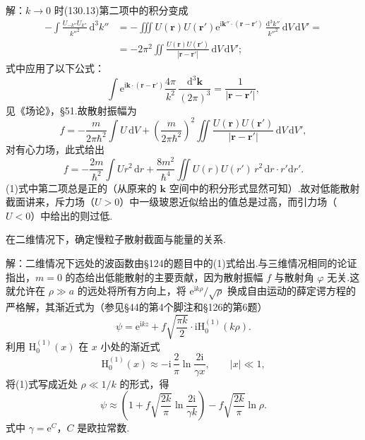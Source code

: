 \begin{xiti}
解：$k\to0$ 时(130.13)第二项中的积分变成
\begin{equation*}
\begin{aligned}
  -\int\frac{U_{-k''}U_{k''}}{k''^2}\,\mathrm{d}^3k''
  &=-\iiint U(\boldsymbol{r})U(\boldsymbol{r}')
  \mathrm{e}^{\mathrm{i}\boldsymbol{k}''\cdot(\boldsymbol{r}-\boldsymbol{r}')}\,
  \frac{\mathrm{d}^3k''}{k''^2}\,\mathrm{d}V\,\mathrm{d}V'=\\
  &=-2\pi^2\iint
  \frac{U(\boldsymbol{r})U(\boldsymbol{r}')}{|\boldsymbol{r}-\boldsymbol{r}'|}\,
  \mathrm{d}V\,\mathrm{d}V';
\end{aligned}
\end{equation*}
式中应用了以下公式：
\begin{equation*}
  \int\mathrm{e}^{\mathrm{i}\boldsymbol{k}\cdot(\boldsymbol{r}-\boldsymbol{r}')}
  \frac{4\pi}{k^2}\,\frac{\mathrm{d}^3\boldsymbol{k}}{(2\pi)^3}
  =\frac{1}{|\boldsymbol{r}-\boldsymbol{r}'|},
\end{equation*}
见《场论》，§51.故散射振幅为
\setcounter{equation}{0}%
\begin{equation}
  f=-\frac{m}{2\pi\hbar^2}\int U\,\mathrm{d}V
  +\left(\frac{m}{2\pi\hbar^2}\right)^{2}
  \iint\frac{U(\boldsymbol{r})U(\boldsymbol{r}')}{|\boldsymbol{r}-\boldsymbol{r}'|}\,
  \mathrm{d}V\,\mathrm{d}V',
\end{equation}
对有心力场，此式给出
\begin{equation*}
  f=-\frac{2m}{\hbar^2}\int Ur^2\,\mathrm{d}r
  +\frac{8m^2}{\hbar^4}\iint U(r)U(r')\,r^2\,\mathrm{d}r\cdot r'\mathrm{d}r'.
\end{equation*}
(1)式中第二项总是正的（从原来的 $\boldsymbol{k}$ 空间中的积分形式显然可知）.故对低能散射截面讲来，斥力场（$U>0$）中一级玻恩近似给出的值总是过高，而引力场（$U<0$）中给出的则过低.

\quad 在二维情况下，确定慢粒子散射截面与能量的关系.

解：二维情况下远处的波函数由§124的题目中的(1)式给出.与三维情况相同的论证指出，$m=0$ 的态给出低能散射的主要贡献，因为散射振幅 $f$ 与散射角 $\varphi$ 无关.这就允许在 $\rho\gg a$ 的远处将所有方向上，将 $\mathrm{e}^{\mathrm{i}k\rho}/\sqrt{\rho}$ 换成自由运动的薛定谔方程的严格解，其渐近式为（参见§44的第4个脚注和§126的第6题）
\setcounter{equation}{0}%
\begin{equation}
  \psi=\mathrm{e}^{\mathrm{i}kz}
  +f\sqrt{\frac{\pi k}{2}}\cdot\mathrm{i}\mathrm{H}_0^{(1)}(k\rho).
\end{equation}
利用 $\mathrm{H}_0^{(1)}(x)$ 在 $x$ 小处的渐近式
\begin{equation*}
  \mathrm{H}_0^{(1)}(x)\approx-\mathrm{i}\,\frac{2}{\pi}
  \ln\frac{2\mathrm{i}}{\gamma x},\qquad|x|\ll1,
\end{equation*}
将(1)式写成近处 $\rho\ll1/k$ 的形式，得
\begin{equation}
  \psi\approx\left(1+f\sqrt{\frac{2k}{\pi}}
  \ln\frac{2\mathrm{i}}{\gamma k}\right)
  -f\sqrt{\frac{2k}{\pi}}\ln\rho.
\end{equation}
式中 $\gamma=\mathrm{e}^{C}$，$C$ 是欧拉常数.


\end{xiti}
